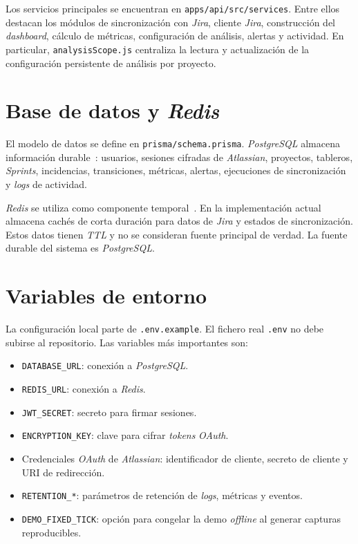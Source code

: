 \begin{refsection}
Los servicios principales se encuentran en \texttt{apps/api/src/services}. Entre ellos destacan los módulos de sincronización con \textit{Jira}, cliente \textit{Jira}, construcción del \textit{dashboard}, cálculo de métricas, configuración de análisis, alertas y actividad. En particular, \texttt{analysisScope.js} centraliza la lectura y actualización de la configuración persistente de análisis por proyecto.

\section{Base de datos y \textit{Redis}}

El modelo de datos se define en \texttt{prisma/schema.prisma}. \textit{PostgreSQL} almacena información durable~\cite{PrismaDocs,PostgreSQLDocs}: usuarios, sesiones cifradas de \textit{Atlassian}, proyectos, tableros, \textit{Sprints}, incidencias, transiciones, métricas, alertas, ejecuciones de sincronización y \textit{logs} de actividad.

\textit{Redis} se utiliza como componente temporal~\cite{RedisDocs}. En la implementación actual almacena cachés de corta duración para datos de \textit{Jira} y estados de sincronización. Estos datos tienen \textit{TTL} y no se consideran fuente principal de verdad. La fuente durable del sistema es \textit{PostgreSQL}.

\section{Variables de entorno}

La configuración local parte de \texttt{.env.example}. El fichero real \texttt{.env} no debe subirse al repositorio. Las variables más importantes son:

\begin{itemize}
    \item \texttt{DATABASE\_URL}: conexión a \textit{PostgreSQL}.
    \item \texttt{REDIS\_URL}: conexión a \textit{Redis}.
    \item \texttt{JWT\_SECRET}: secreto para firmar sesiones.
    \item \texttt{ENCRYPTION\_KEY}: clave para cifrar \textit{tokens} \textit{OAuth}.
    \item Credenciales \textit{OAuth} de \textit{Atlassian}: identificador de cliente, secreto de cliente y URI de redirección.
    \item \texttt{RETENTION\_*}: parámetros de retención de \textit{logs}, métricas y eventos.
    \item \texttt{DEMO\_FIXED\_TICK}: opción para congelar la demo \textit{offline} al generar capturas reproducibles.
\end{itemize}


\end{refsection}

